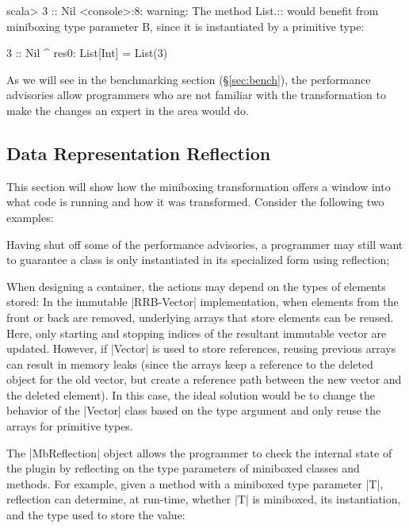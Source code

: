 \begin{lstlisting-nobreak}
 scala> 3 :: Nil
 <console>:8: warning: The method List.:: would benefit from miniboxing type parameter B, since it is instantiated by a primitive type:

               3 :: Nil
                 ^
 res0: List[Int] = List(3)
\end{lstlisting-nobreak}

As we will see in the benchmarking section (\S\ref{sec:bench}), the performance advisories allow programmers who are not familiar with the transformation to make the changes an expert in the area would do.

\subsection{Data Representation Reflection}

This section will show how the miniboxing transformation offers a window into what code is running and how it was transformed. Consider the following two examples:

\begin{compactitem}
\item Having shut off some of the performance advisories, a programmer may still want to guarantee a class is only instantiated in its specialized form using reflection;
\item When designing a container, the actions may depend on the types of elements stored: In the immutable |RRB-Vector| \cite{nicolas-thesis} implementation, when elements from the front or back are removed, underlying arrays that store elements can be reused. Here, only starting and stopping indices of the resultant immutable vector are updated. However, if |Vector| is used to store references, reusing previous arrays can result in memory leaks (since the arrays keep a reference to the deleted object for the old vector, but create a reference path between the new vector and the deleted element). In this case, the ideal solution would be to change the behavior of the |Vector| class based on the type argument and only reuse the arrays for primitive types.
\end{compactitem}

The |MbReflection| object allows the programmer to check the internal state of the plugin by reflecting on the type parameters of miniboxed classes and methods. For example, given a method with a miniboxed type parameter |T|, reflection can determine, at run-time, whether |T| is miniboxed, its instantiation, and the type used to store the value:

